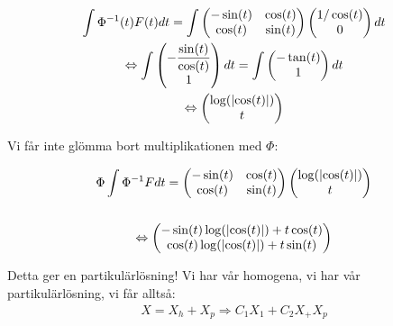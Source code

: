 \begin{equation*}
  \begin{gathered}
    \int\Phi^{-1}(t)F(t)dt = \int\begin{pmatrix}-\sin(t)&\cos(t)\\\cos(t)&\sin(t)\end{pmatrix}\begin{pmatrix}1/\cos(t)\\0\end{pmatrix}dt\\
    \Leftrightarrow \int\begin{pmatrix}-\dfrac{\sin(t)}{\cos(t)}\\1\end{pmatrix}dt = \int\begin{pmatrix}-\tan(t)\\1\end{pmatrix}dt\\
    \Leftrightarrow \begin{pmatrix}\log(\left|\cos(t)\right|)\\t\end{pmatrix}
  \end{gathered}
\end{equation*}\par
\noindent Vi får inte glömma bort multiplikationen med $\Phi$:
\par\bigskip

\begin{equation*}
  \begin{gathered}
    \Phi\int\Phi^{-1}Fdt = \begin{pmatrix}-\sin(t)&\cos(t)\\\cos(t)&\sin(t)\end{pmatrix}\begin{pmatrix}\log(\left|\cos(t)\right|)\\t\end{pmatrix}\\\\
    \Leftrightarrow \begin{pmatrix}-\sin(t)\log(\left|\cos(t)\right|)+t\cos(t)\\\cos(t)\log(\left|\cos(t)\right|)+t\sin(t)\end{pmatrix}
  \end{gathered}
\end{equation*}
\par\bigskip

\noindent Detta ger en partikulärlösning! Vi har vår homogena, vi har vår partikulärlösning, vi får alltså:
\begin{equation*}
  \begin{gathered}
    X = X_h+X_p \Rightarrow C_1X_1+C_2X_+X_p
  \end{gathered}
\end{equation*}
\par\bigskip
